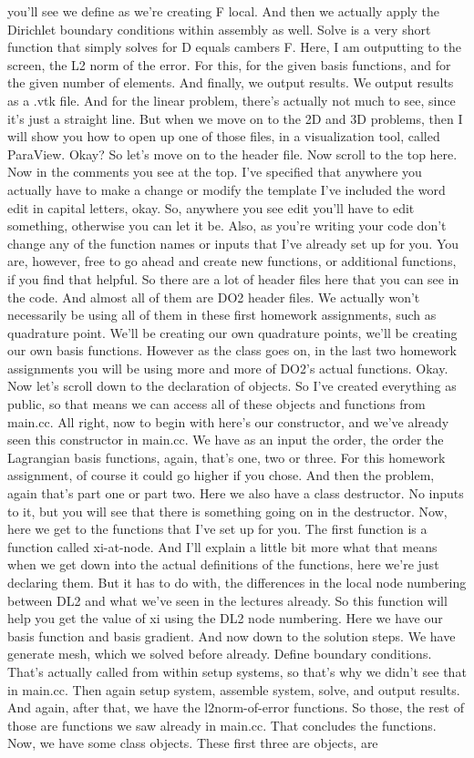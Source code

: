 \documentclass[10pt]{article}
\begin{document}
you'll see we define as we're creating F local. And then we actually apply the Dirichlet boundary conditions within assembly as well. Solve is a very short function that simply solves for D equals cambers F. Here, I am outputting to the screen, the L2 norm of the error. For this, for the given basis functions, and for the given number of elements. And finally, we output results. We output results as a .vtk file. And for the linear problem, there's actually not much to see, since it's just a straight line. But when we move on to the 2D and 3D problems, then I will show you how to open up one of those files, in a visualization tool, called ParaView. Okay? So let's move on to the header file. Now scroll to the top here.  Now in the comments you see at the top. I've specified that anywhere you actually have to make a change or modify the template I've included the word edit in capital letters, okay. So, anywhere you see edit you'll have to edit something, otherwise you can let it be. Also, as you're writing your code don't change any of the function names or inputs that I've already set up for you. You are, however, free to go ahead and create new functions, or additional functions, if you find that helpful. So there are a lot of header files here that you can see in the code. And almost all of them are DO2 header files. We actually won't necessarily be using all of them in these first homework assignments, such as quadrature point. We'll be creating our own quadrature points, we'll be creating our own basis functions. However as the class goes on, in the last two homework assignments you will be using more and more of DO2's actual functions. Okay. Now let's scroll down to the declaration of objects. So I've created everything as public, so that means we can access all of these objects and functions from main.cc. All right, now to begin with here's our constructor, and we've already seen this constructor in main.cc. We have as an input the order, the order the Lagrangian basis functions, again, that's one, two or three. For this homework assignment, of course it could go higher if you chose. And then the problem, again that's part one or part two. Here we also have a class destructor. No inputs to it, but you will see that there is something going on in the destructor. Now, here we get to the functions that I've set up for you. The first function is a function called xi-at-node. And I'll explain a little bit more what that means when we get down into the actual definitions of the functions, here we're just declaring them. But it has to do with, the differences in the local node numbering between DL2 and what we've seen in the lectures already. So this function will help you get the value of xi using the DL2 node numbering. Here we have our basis function and basis gradient. And now down to the solution steps. We have generate mesh, which we solved before already. Define boundary conditions. That's actually called from within setup systems, so that's why we didn't see that in main.cc. Then again setup system, assemble system, solve, and output results. And again, after that, we have the l2norm-of-error functions. So those, the rest of those are functions we saw already in main.cc. That concludes the functions. Now, we have some class objects. These first three are objects, are 
\end{document}
